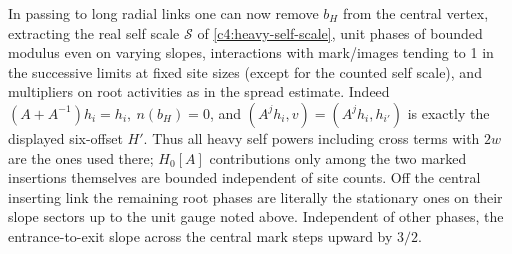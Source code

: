 In passing to long radial links one can now remove \(b_H\) from the central vertex, extracting the real self scale \(\mathcal S\) of \eqref{c4:heavy-self-scale}, unit phases of bounded modulus even on varying slopes, interactions with mark/images tending to 1 in the successive limits at fixed site sizes (except for the counted self scale), and multipliers on root activities as in the spread estimate. Indeed \((A+A^{-1})h_i=h_i,\ n(b_H)=0\), and \((A^j h_i,v)=(A^j h_i,h_{i'})\) is exactly the displayed six-offset \(H'\). Thus all heavy self powers including cross terms with \(2w\) are the ones used there; \(H_0[A]\) contributions only among the two marked insertions themselves are bounded independent of site counts. Off the central inserting link the remaining root phases are literally the stationary ones on their slope sectors up to the unit gauge noted above. Independent of other phases, the entrance-to-exit slope across the central mark steps upward by \(3/2\).

